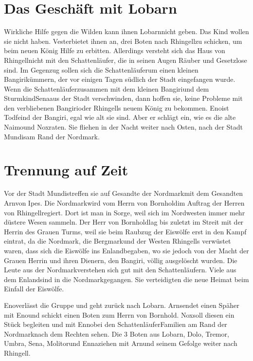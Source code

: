 \documentclass[12pt,a4paper,onecolumn,twoside,ngerman]{book}
\newcommand{\Molitor}{Molitor}
\newcommand{\Sena}{Sena}
\newcommand{\Sturmkind}{Sturmkind}
\newcommand{\Bangiri}{Bangiri}
\newcommand{\Enland}{Enland}
\newcommand{\Schattenlaufer}{Schattenläufer}
\newcommand{\Eno}{Eno}
\newcommand{\Dolo}{Dolo}
\newcommand{\Nox}{Nox}
\newcommand{\Umbra}{Umbra}
\newcommand{\Enna}{Enna}
\newcommand{\Enno}{Enno}
\newcommand{\Tremor}{Tremor}
\newcommand{\Lobarn}{Lobarn}
\newcommand{\Vester}{Vester}
\newcommand{\Naimo}{Naimo}
\newcommand{\Nordmark}{Nordmark}
\newcommand{\Bergmark}{Bergmark}
\newcommand{\Ipes}{Ipes}
\newcommand{\Bornhold}{Bornhold}
\newcommand{\Arn}{Arn}
\newcommand{\Rhingell}{Rhingell}
\newcommand{\Mundis}{Mundis}
\begin{document}
\section{Das Geschäft mit \Lobarn}
Wirkliche Hilfe gegen die Wilden kann ihnen \Lobarn nicht geben. Das Kind wollen sie nicht haben. \Vester bietet ihnen an, drei Boten nach \Rhingell zu schicken, um beim neuen König Hilfe zu erbitten. Allerdings versteht sich das Haus von \Rhingell nicht mit den \Schattenlaufer, die in seinen Augen Räuber und Gesetzlose sind. 
Im Gegenzug sollen sich die \Schattenlaufer um einen kleinen \Bangiri kümmern, der vor einigen Tagen südlich der Stadt eingefangen wurde. 
Wenn die \Schattenlaufer zusammen mit dem kleinen \Bangiri und dem \Sturmkind \Sena aus der Stadt verschwinden, dann hoffen sie, keine Probleme mit den verbliebenen \Bangiri oder \Rhingell{s} neuem König zu bekommen. \Eno ist Todfeind der \Bangiri{,} egal wie alt sie sind. Aber er schlägt ein, wie es die alte \Naimo und \Nox raten. Sie fliehen in der Nacht weiter nach Osten, nach der Stadt \Mundis am Rand der \Nordmark .


\section{Trennung auf Zeit}
Vor der Stadt \Mundis treffen sie auf Gesandte der \Nordmark mit dem Gesandten \Arn von \Ipes{.} Die \Nordmark wird vom Herrn von \Bornhold im Auftrag der Herren von \Rhingell regiert. Dort ist man in Sorge, weil sich im Nordwesten immer mehr düstere Wesen sammeln.
Der Herr von \Bornhold lag bis zuletzt im Streit mit der Herrin des Grauen Turms, weil sie beim Raubzug der Eiswölfe erst in den Kampf  eintrat, da die \Nordmark, die \Bergmark und der Westen \Rhingell{s} verwüstet waren, dass sich die Eiswölfe ins \Enland begaben, wo sie jedoch von der Macht der Grauen Herrin und ihren Dienern, den \Bangiri, völlig ausgelöscht wurden. Die Leute aus der \Nordmark verstehen sich gut mit den \Schattenlaufer{n}. Viele aus dem \Enland sind in die \Nordmark gegangen. Sie verteidigten die neue Heimat beim Einfall der Eiswölfe. 

\Eno verlässt die Gruppe und geht zurück nach \Lobarn . \Arn sendet einen Späher mit \Eno und schickt einen Boten zum Herrn von \Bornhold . \Nox soll diesen ein Stück begleiten und mit \Enno bei den \Schattenlaufer Familien am Rand der \Nordmark nach dem Rechten sehen. Die 3 Boten aus \Lobarn , \Dolo , \Tremor , \Umbra, \Sena , \Molitor und \Enna ziehen mit \Arn und seinem Gefolge weiter nach \Rhingell. 
\end{document}
